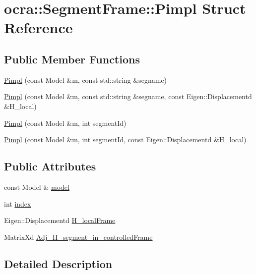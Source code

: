 \hypertarget{structocra_1_1SegmentFrame_1_1Pimpl}{}\section{ocra\+:\+:Segment\+Frame\+:\+:Pimpl Struct Reference}
\label{structocra_1_1SegmentFrame_1_1Pimpl}
\subsection*{Public Member Functions}
\begin{DoxyCompactItemize}
\item 
\hyperlink{structocra_1_1SegmentFrame_1_1Pimpl_a3e4a372b7ffde0baf617f8097a4d9285}{Pimpl} (const Model \&m, const std\+::string \&segname)
\item 
\hyperlink{structocra_1_1SegmentFrame_1_1Pimpl_a419d287d9da1582ff94dd9c3ab539f2b}{Pimpl} (const Model \&m, const std\+::string \&segname, const Eigen\+::\+Displacementd \&H\+\_\+local)
\item 
\hyperlink{structocra_1_1SegmentFrame_1_1Pimpl_a0de56572f8a4d14450c37bd71e432f2e}{Pimpl} (const Model \&m, int segment\+Id)
\item 
\hyperlink{structocra_1_1SegmentFrame_1_1Pimpl_a6bc146a3436c88655f79afd8bf7a46b3}{Pimpl} (const Model \&m, int segment\+Id, const Eigen\+::\+Displacementd \&H\+\_\+local)
\end{DoxyCompactItemize}
\subsection*{Public Attributes}
\begin{DoxyCompactItemize}
\item 
const Model \& \hyperlink{structocra_1_1SegmentFrame_1_1Pimpl_a787a1cc368ab12229ecd11358e2805e1}{model}
\item 
int \hyperlink{structocra_1_1SegmentFrame_1_1Pimpl_aeeadbd2b42d3e0cf750cbc0df50f213c}{index}
\item 
Eigen\+::\+Displacementd \hyperlink{structocra_1_1SegmentFrame_1_1Pimpl_a5e0d767dc540fbd56b1e6f125ba7abf6}{H\+\_\+local\+Frame}
\item 
Matrix\+Xd \hyperlink{structocra_1_1SegmentFrame_1_1Pimpl_a3b188df19a7b138373a1861dfa5aad1d}{Adj\+\_\+\+H\+\_\+segment\+\_\+in\+\_\+controlled\+Frame}
\end{DoxyCompactItemize}


\subsection{Detailed Description}


